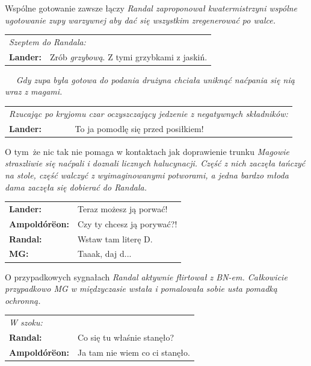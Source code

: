 \documentclass[10pt,twoside,twocolumn]{book}
\begin{document}
\begin{rpg-quotebox}{Wspólne gotowanie zawsze łączy}
   \textit{Randal zaproponował kwatermistrzyni wspólne ugotowanie zupy warzywnej aby dać się wszystkim zregenerować po walce.}\\

   \begin{tabularx}{\columnwidth}{lX}
      \multicolumn{2}{l}{\textit{Szeptem do Randala:}}\\
      \textbf{Lander:} & Zrób \emph{grzybową}. Z tymi grzybkami z jaskiń.\\
   \end{tabularx}
   ~\newline~
   \textit{Gdy zupa była gotowa do podania drużyna chciała uniknąć naćpania się nią wraz z magami.}\\

   \begin{tabularx}{\columnwidth}{lX}
      \multicolumn{2}{X}{\textit{Rzucając po kryjomu czar oczyszczający jedzenie z negatywnych składników:}}\\
      \textbf{Lander:} & To ja pomodlę się przed posiłkiem!\\
   \end{tabularx}
\end{rpg-quotebox}

\begin{rpg-quotebox}{O tym\, że nic tak nie pomaga w kontaktach jak doprawienie trunku}
   \textit{Magowie straszliwie się naćpali i doznali licznych halucynacji. Część z nich zaczęła tańczyć na stole, część walczyć z wyimaginowanymi potworami, a jedna bardzo młoda dama zaczęła się dobierać do Randala.}\\

   \begin{tabularx}{\columnwidth}{lX}
      \textbf{Lander:} & Teraz możesz ją porwać!\\
      \textbf{Ampoldórëon:} & Czy ty chcesz ją porywać?!\\
      \textbf{Randal:} & Wstaw tam literę D.\\
      \textbf{MG:} & Taaak, daj d...\\
   \end{tabularx}
\end{rpg-quotebox}

\begin{rpg-quotebox}{O przypadkowych sygnałach}
   \textit{Randal aktywnie flirtował z BN-em. Całkowicie przypadkowo MG w międzyczasie wstała i pomalowała sobie usta pomadką ochronną.}\\

   \begin{tabularx}{\columnwidth}{lX}
      \multicolumn{2}{l}{\textit{W szoku:}}\\
      \textbf{Randal:} & Co się tu właśnie stanęło?\\
      \textbf{Ampoldórëon:} & Ja tam nie wiem co ci stanęło.\\
   \end{tabularx}
\end{rpg-quotebox}
\end{document}
